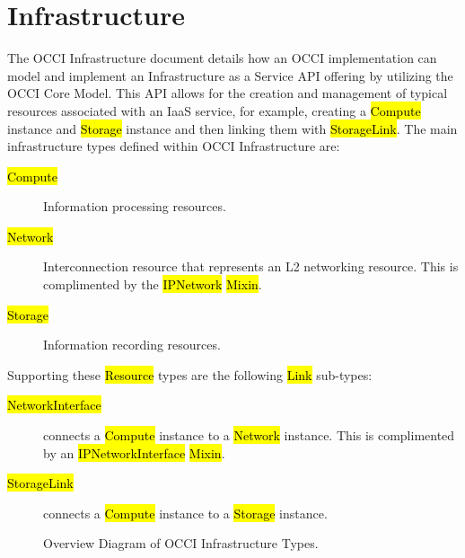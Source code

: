 \documentclass[10pt,a4paper]{article}
\begin{document}

\section{Infrastructure}
The OCCI Infrastructure document details how an OCCI implementation
can model and implement an Infrastructure as a Service API offering by
utilizing the OCCI Core Model. This API allows for the creation and
management of typical resources associated with an IaaS service, for
example, creating a \hl{Compute} instance and \hl{Storage} instance
and then linking them with \hl{StorageLink}. The main infrastructure
types defined within OCCI Infrastructure are:

\begin{description}
\item[\hl{Compute}] Information processing resources.
\item[\hl{Network}] Interconnection resource that represents an L2
  networking resource. This is complimented by the \hl{IPNetwork}
  \hl{Mixin}.
\item[\hl{Storage}] Information recording resources.
\end{description}

Supporting these \hl{Resource} types are the following \hl{Link} sub-types:

\begin{description}
\item[\hl{NetworkInterface}] connects a \hl{Compute} instance to a
  \hl{Network} instance. This is complimented by an
  \hl{IPNetworkInterface} \hl{Mixin}.
\item[\hl{StorageLink}] connects a \hl{Compute} instance to a
  \hl{Storage} instance.
\end{description}

\begin{figure}[!h]
	{\centering {} \par}
	\caption{Overview Diagram of OCCI Infrastructure Types.}
	\label{fig:infra_uml}
\end{figure}
\end{document}
